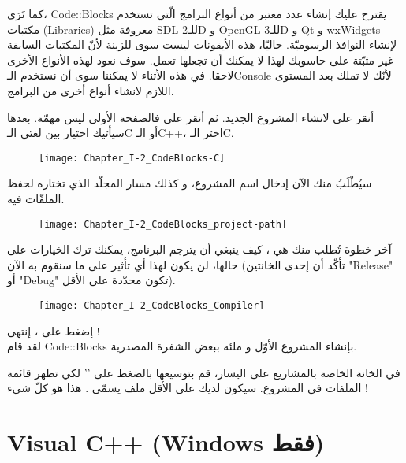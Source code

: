 \begin{information}
كما تَرَى،
\textenglish{Code::Blocks}
يقترح عليك إنشاء عدد معتبر من أنواع البرامج الّتي تستخدم مكتبات
(\textenglish{Libraries})
معروفة مثل
\textenglish{SDL}
للـ\textenglish{2D}
و
\textenglish{OpenGL}
للـ\textenglish{3D}
و
\textenglish{Qt}
و
\textenglish{wxWidgets}
لإنشاء النوافذ الرسوميّة. حاليّا، هذه الأيقونات ليست سوى للزينة لأنّ المكتبات السابقة غير مثبّتة على حاسوبك لهذا لا يمكنك أن تجعلها تعمل. سوف نعود لهذه الأنواع الأخرى لاحقا. في هذه الأثناء لا يمكننا سوى أن نستخدم الـ\textenglish{Console}
لأنّك لا تملك بعد المستوى اللازم لانشاء أنواع أخرى من البرامج.
\end{information}

أنقر على
لانشاء المشروع الجديد. ثم أنقر على
فالصفحة الأولى ليس مهمّة. بعدها سيأتيك اختيار بين لغتي الـ\textenglish{C}
أو الـ\textenglish{C++}،
اختر الـ\textenglish{C}.

\begin{figure}[H]
	\centering
	\texttt{[image: Chapter\_I-2\_CodeBlocks-C]}
\end{figure}

سيُطْلَبُ منك الآن إدخال اسم المشروع، و كذلك مسار المجلّد الذي تختاره لحفظ الملفّات فيه.

\begin{figure}[H]
	\centering
	\texttt{[image: Chapter\_I-2\_CodeBlocks\_project-path]}
\end{figure}

آخر خطوة تُطلب منك هي ، كيف ينبغي أن يترجم البرنامج، يمكنك ترك الخيارات على حالها، لن يكون لهذا أي تأثير على ما سنقوم به الآن (تأكّد أن إحدى الخانتين
"\textenglish{Release}"
أو
"\textenglish{Debug}"
تكون محدّدة على الأقل).

\begin{figure}[H]
	\centering
	\texttt{[image: Chapter\_I-2\_CodeBlocks\_Compiler]}
\end{figure}

إضغط على
،
إنتهى !\\
لقد قام
\textenglish{Code::Blocks}
بإنشاء المشروع الأوّل و ملئه ببعض الشفرة المصدرية.

في الخانة الخاصة بالمشاريع على اليسار، قم بتوسيعها بالضغط على
'\InlineCode{+}'
لكي تظهر قائمة الملفات في المشروع. سيكون لديك على الأقل ملف يسمّى
.
هذا هو كلّ شيء !

\section{\textenglish{Visual C++} (\textenglish{Windows} فقط)}


